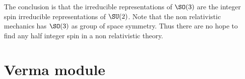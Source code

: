 \label{pg:reprez_SO3}The conclusion is that the irreducible representations of $\SO(3)$ are the integer spin irreducible representations of $\SU(2)$. Note that the non relativistic mechanics has $\SO(3)$ as group of space symmetry. Thus there are no hope to find any half integer spin in a non relativistic theory.



\section{Verma module}

